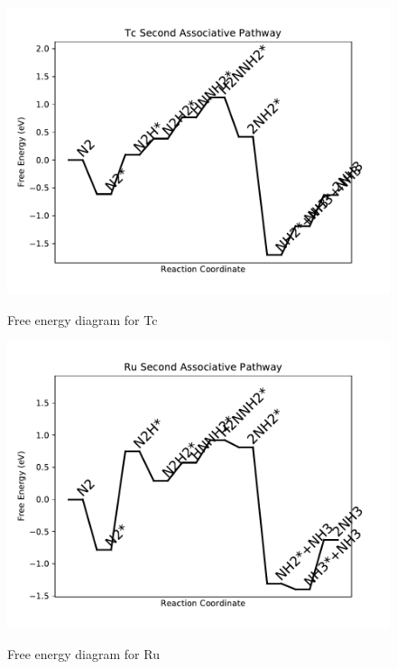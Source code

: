 \documentclass{article}
\begin{document}
\begin{figure}
\includegraphics[width=1\linewidth]{data/plots/Tc_associative_2.pdf}
\label{fig:Tc_associative_2}
\caption{Free energy diagram for Tc}
\end{figure}

\begin{figure}
\includegraphics[width=1\linewidth]{data/plots/Ru_associative_2.pdf}
\label{fig:Ru_associative_2}
\caption{Free energy diagram for Ru}
\end{figure}
\end{document}

